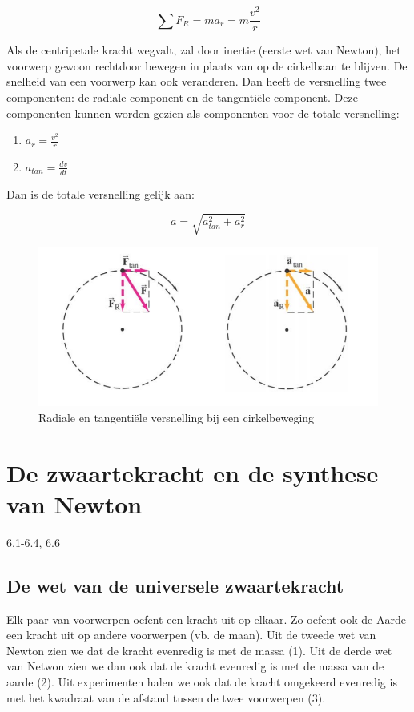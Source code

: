 \documentclass[12pt,a4paper]{article}
\begin{document}
    $$ \sum F_{R} = ma_{r} = m\frac{v^{2}}{r} $$ 
    
    Als de centripetale kracht wegvalt, zal door inertie (eerste wet van Newton), het voorwerp gewoon rechtdoor bewegen in plaats van op de cirkelbaan te blijven. 
    De snelheid van een voorwerp kan ook veranderen. Dan heeft de versnelling twee componenten: de radiale component en de tangentiële component. Deze componenten
    kunnen worden gezien als componenten voor de totale versnelling:
    
    \begin{enumerate}
    	\item $a_{r} = \frac{v^{2}}{r}$
    	\item $a_{tan} = \frac{dv}{dt}$
    \end{enumerate}
    
    Dan is de totale versnelling gelijk aan:
    
    $$ a = \sqrt{a_{tan}^{2} + a_{r}^{2}} $$ 
    
    \begin{figure}[h]
    	\centering
	\includegraphics[width=0.6\linewidth]{cirkel_versnelling}
    	\caption{Radiale en tangentiële versnelling bij een cirkelbeweging}
        	\label{cirkel_versnelling}
    \end{figure}

    \section{De zwaartekracht en de synthese van Newton}
    6.1-6.4, 6.6

    \subsection{De wet van de universele zwaartekracht}
    Elk paar van voorwerpen oefent een kracht uit op elkaar. Zo oefent ook de Aarde een kracht uit op andere voorwerpen (vb. de maan). 
    Uit de tweede wet van Newton zien we dat de kracht evenredig is met de massa (1). Uit de derde wet van Netwon
    zien we dan ook dat de kracht evenredig is met de massa van de aarde (2). Uit experimenten halen we ook dat de kracht
    omgekeerd evenredig is met het kwadraat van de afstand tussen de twee voorwerpen (3). 
    
\end{document}
